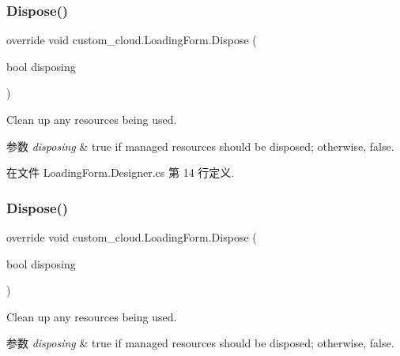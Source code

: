 \subsubsection{\texorpdfstring{Dispose()}{Dispose()}\hspace{0.1cm}{\footnotesize\ttfamily [1/2]}}
{\footnotesize\ttfamily override void custom\+\_\+cloud.\+Loading\+Form.\+Dispose (\begin{DoxyParamCaption}\item[{bool}]{disposing }\end{DoxyParamCaption})\hspace{0.3cm}{\ttfamily [protected]}}



Clean up any resources being used. 


\begin{DoxyParams}{参数}
{\em disposing} & true if managed resources should be disposed; otherwise, false.\\
\hline
\end{DoxyParams}


在文件 Loading\+Form.\+Designer.\+cs 第 14 行定义.

\mbox{\label{classcustom__cloud_1_1_loading_form_a88dfe098eba5a4f26b4c9f351af7ee7c}} 
\subsubsection{\texorpdfstring{Dispose()}{Dispose()}\hspace{0.1cm}{\footnotesize\ttfamily [2/2]}}
{\footnotesize\ttfamily override void custom\+\_\+cloud.\+Loading\+Form.\+Dispose (\begin{DoxyParamCaption}\item[{bool}]{disposing }\end{DoxyParamCaption})\hspace{0.3cm}{\ttfamily [protected]}}



Clean up any resources being used. 


\begin{DoxyParams}{参数}
{\em disposing} & true if managed resources should be disposed; otherwise, false.\\
\hline
\end{DoxyParams}



